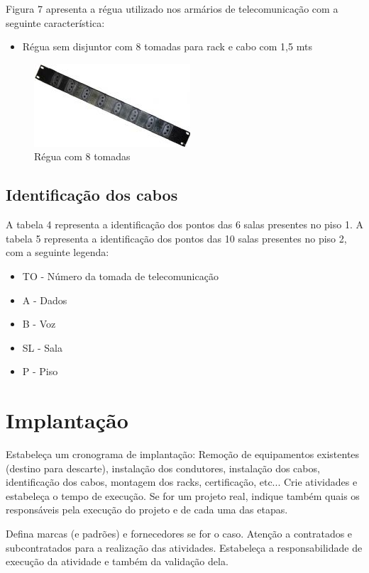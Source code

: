 \documentclass[	DIV=calc,%
							paper=a4,%
							fontsize=12pt,%
							onecolumn]{scrartcl}	 					%
\begin{document}
Figura 7 apresenta a régua utilizado nos armários de telecomunicação com a seguinte característica: 
\begin{itemize}
\item Régua sem disjuntor com 8 tomadas para rack e cabo com 1,5 mts
\end{itemize}

\begin{figure}
	\centering
	\includegraphics[]{regua}
	\caption{Régua com 8 tomadas}
	\label{fig7}
\end{figure}


\subsection{Identificação dos cabos}
A tabela 4 representa a identificação dos pontos das 6 salas presentes no piso 1.
A tabela 5 representa a identificação dos pontos das 10 salas presentes no piso 2, com a seguinte legenda:
\begin{itemize}
\item TO - Número da tomada de telecomunicação
\item A  - Dados 
\item B  - Voz	
\item SL - Sala 
\item P  - Piso
\end{itemize}





\section{Implantação}
Estabeleça um cronograma de implantação:
Remoção de equipamentos existentes (destino para descarte), instalação dos condutores, instalação dos cabos, 
identificação dos cabos, montagem dos racks, certificação, etc... Crie atividades e estabeleça o tempo de execução. Se for um projeto real, indique também quais os responsáveis pela execução do projeto e de cada uma das etapas.

Defina marcas (e padrões) e fornecedores se for o caso. Atenção a contratados e subcontratados para a realização das atividades. Estabeleça a responsabilidade de execução da atividade e também da validação dela.
\end{document}
